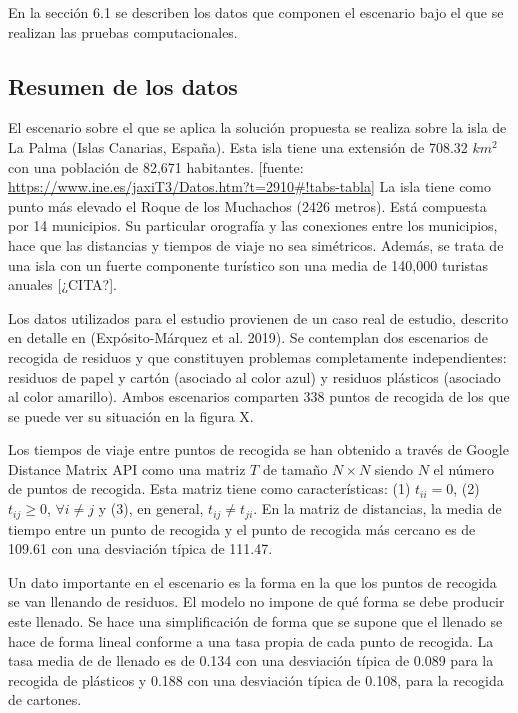\documentclass[
]{article}
\begin{document}
En la sección 6.1 se describen los datos que componen el escenario bajo
el que se realizan las pruebas computacionales.

\hypertarget{resumen-de-los-datos}{%
\subsection{Resumen de los datos}\label{resumen-de-los-datos}}

El escenario sobre el que se aplica la solución propuesta se realiza
sobre la isla de La Palma (Islas Canarias, España). Esta isla tiene una
extensión de 708.32 \(km^2\) con una población de 82,671 habitantes.
{[}fuente:
\url{https://www.ine.es/jaxiT3/Datos.htm?t=2910\#!tabs-tabla}{]} La isla
tiene como punto más elevado el Roque de los Muchachos (2426 metros).
Está compuesta por 14 municipios. Su particular orografía y las
conexiones entre los municipios, hace que las distancias y tiempos de
viaje no sea simétricos. Además, se trata de una isla con un fuerte
componente turístico son una media de 140,000 turistas anuales
{[}¿CITA?{]}.

Los datos utilizados para el estudio provienen de un caso real de
estudio, descrito en detalle en (Expósito-Márquez et al. 2019). Se
contemplan dos escenarios de recogida de residuos y que constituyen
problemas completamente independientes: residuos de papel y cartón
(asociado al color azul) y residuos plásticos (asociado al color
amarillo). Ambos escenarios comparten 338 puntos de recogida de los que
se puede ver su situación en la figura X.

Los tiempos de viaje entre puntos de recogida se han obtenido a través
de Google Distance Matrix API como una matriz \(T\) de tamaño
\(N\times N\) siendo \(N\) el número de puntos de recogida. Esta matriz
tiene como características: (1) \(t_{ii} = 0\), (2) \(t_{ij} \geq 0\),
\(\forall i\neq j\) y (3), en general, \(t_{ij}\neq t_{ji}\). En la
matriz de distancias, la media de tiempo entre un punto de recogida y el
punto de recogida más cercano es de 109.61 con una desviación típica de
111.47.

Un dato importante en el escenario es la forma en la que los puntos de
recogida se van llenando de residuos. El modelo no impone de qué forma
se debe producir este llenado. Se hace una simplificación de forma que
se supone que el llenado se hace de forma lineal conforme a una tasa
propia de cada punto de recogida. La tasa media de de llenado es de
0.134 con una desviación típica de 0.089 para la recogida de plásticos y
0.188 con una desviación típica de 0.108, para la recogida de cartones.
\end{document}
